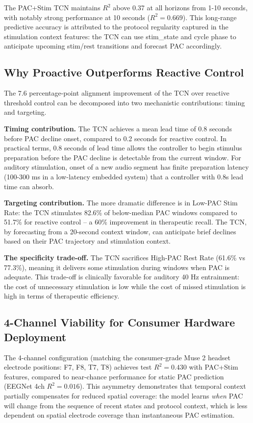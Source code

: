 \documentclass[11pt,letterpaper]{article}
\begin{document}
The PAC+Stim TCN maintains $R^2$ above 0.37 at all horizons from 1-10 seconds, with notably strong performance at 10 seconds ($R^2 = 0.669$). This long-range predictive accuracy is attributed to the protocol regularity captured in the stimulation context features: the TCN can use stim\_state and cycle phase to anticipate upcoming stim/rest transitions and forecast PAC accordingly.

\subsection{Why Proactive Outperforms Reactive Control}

The 7.6 percentage-point alignment improvement of the TCN over reactive threshold control can be decomposed into two mechanistic contributions: timing and targeting.

\textbf{Timing contribution.} The TCN achieves a mean lead time of 0.8 seconds before PAC decline onset, compared to 0.2 seconds for reactive control. In practical terms, 0.8 seconds of lead time allows the controller to begin stimulus preparation before the PAC decline is detectable from the current window. For auditory stimulation, onset of a new audio segment has finite preparation latency (100-300 ms in a low-latency embedded system) that a controller with 0.8s lead time can absorb.

\textbf{Targeting contribution.} The more dramatic difference is in Low-PAC Stim Rate: the TCN stimulates 82.6\% of below-median PAC windows compared to 51.7\% for reactive control -- a 60\% improvement in therapeutic recall. The TCN, by forecasting from a 20-second context window, can anticipate brief declines based on their PAC trajectory and stimulation context.

\textbf{The specificity trade-off.} The TCN sacrifices High-PAC Rest Rate (61.6\% vs 77.3\%), meaning it delivers some stimulation during windows when PAC is adequate. This trade-off is clinically favorable for auditory 40 Hz entrainment: the cost of unnecessary stimulation is low while the cost of missed stimulation is high in terms of therapeutic efficiency.

\subsection{4-Channel Viability for Consumer Hardware Deployment}

The 4-channel configuration (matching the consumer-grade Muse 2 headset electrode positions: F7, F8, T7, T8) achieves test $R^2 = 0.430$ with PAC+Stim features, compared to near-chance performance for static PAC prediction (EEGNet 4ch $R^2 = 0.016$). This asymmetry demonstrates that temporal context partially compensates for reduced spatial coverage: the model learns \textit{when} PAC will change from the sequence of recent states and protocol context, which is less dependent on spatial electrode coverage than instantaneous PAC estimation.
\end{document}
